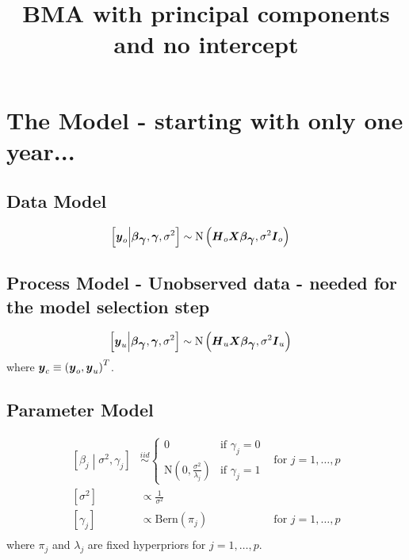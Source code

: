 \documentclass[fleqn]{article}
\title{BMA with principal components and no intercept}
\def\bm#1{\mbox{\boldmath $#1$}}
\begin{document}
\section{The Model - starting with only one year...}
\subsection{Data Model}
%
%
\begin{align*}
%
\left[ \bm{y}_{o} \middle| \bm{\beta}_{\bm{\gamma}}, \bm{\gamma}, \sigma^2 \right] & \sim \mbox{N}\left( \bm{H}_o \bm{X} \bm{\beta}_{\bm{\gamma}}, \sigma^2 \bm{I}_o \right)
%
\end{align*}
\subsection{Process Model - Unobserved data - needed for the model selection step}
%
\begin{align*}
%
\left[ \bm{y}_{u} \middle| \bm{\beta}_{\bm{\gamma}}, \bm{\gamma}, \sigma^2 \right] & \sim \mbox{N}\left( \bm{H}_u \bm{X} \bm{\beta}_{\bm{\gamma}}, \sigma^2 \bm{I}_u \right)
%
\end{align*}
%
where $\bm{y}_c \equiv \left( \bm{y}_o, \bm{y}_u \right)^T$.
\subsection{Parameter Model}
\begin{align*}
%
\left[ \beta_{j} \middle| \sigma^2, \gamma_j \right] & \stackrel{iid} {\sim} \begin{cases} 0 & \mbox{if } \gamma_j = 0\\ \mbox{N}\left( 0, \frac{\sigma^2} {\lambda_j} \right) & \mbox{if } \gamma_j = 1 \end{cases} & \mbox{for } j = 1, \ldots , p \\
%
\left[ \sigma^2 \right] & \propto \frac{1} {\sigma^2} \\
%
\left[ \gamma_{j} \right] & \propto \mbox{Bern} \left( \pi_j \right) & \mbox{for } j = 1, \ldots, p\\
%
\end{align*}
where $\pi_j$ and $\lambda_j$ are fixed hyperpriors for $j = 1, \ldots, p$. 
%
\end{document}
